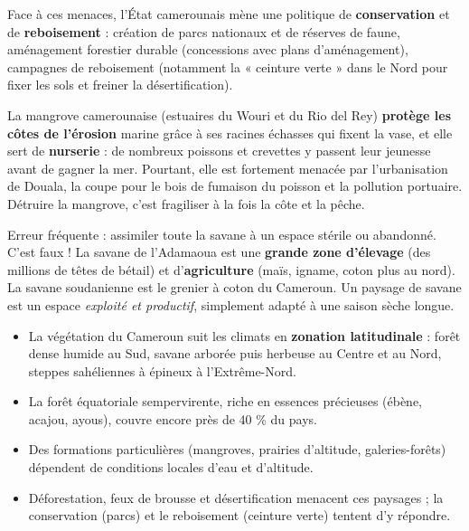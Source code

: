 \documentclass[11pt]{article}
\begin{document}
Face à ces menaces, l'État camerounais mène une politique de \textbf{conservation} et de \textbf{reboisement} : création de parcs nationaux et de réserves de faune, aménagement forestier durable (concessions avec plans d'aménagement), campagnes de reboisement (notamment la « ceinture verte » dans le Nord pour fixer les sols et freiner la désertification).

\begin{savaistu}
La mangrove camerounaise (estuaires du Wouri et du Rio del Rey) \textbf{protège les côtes de l'érosion} marine grâce à ses racines échasses qui fixent la vase, et elle sert de \textbf{nurserie} : de nombreux poissons et crevettes y passent leur jeunesse avant de gagner la mer. Pourtant, elle est fortement menacée par l'urbanisation de Douala, la coupe pour le bois de fumaison du poisson et la pollution portuaire. Détruire la mangrove, c'est fragiliser à la fois la côte et la pêche.
\end{savaistu}

\begin{attention}
Erreur fréquente : assimiler toute la savane à un espace stérile ou abandonné. C'est faux ! La savane de l'Adamaoua est une \textbf{grande zone d'élevage} (des millions de têtes de bétail) et d'\textbf{agriculture} (maïs, igname, coton plus au nord). La savane soudanienne est le grenier à coton du Cameroun. Un paysage de savane est un espace \emph{exploité et productif}, simplement adapté à une saison sèche longue.
\end{attention}

\begin{aretenir}
\begin{itemize}
\item La végétation du Cameroun suit les climats en \textbf{zonation latitudinale} : forêt dense humide au Sud, savane arborée puis herbeuse au Centre et au Nord, steppes sahéliennes à épineux à l'Extrême-Nord.
\item La forêt équatoriale sempervirente, riche en essences précieuses (ébène, acajou, ayous), couvre encore près de 40 \% du pays.
\item Des formations particulières (mangroves, prairies d'altitude, galeries-forêts) dépendent de conditions locales d'eau et d'altitude.
\item Déforestation, feux de brousse et désertification menacent ces paysages ; la conservation (parcs) et le reboisement (ceinture verte) tentent d'y répondre.
\end{itemize}
\end{aretenir}
\end{document}
